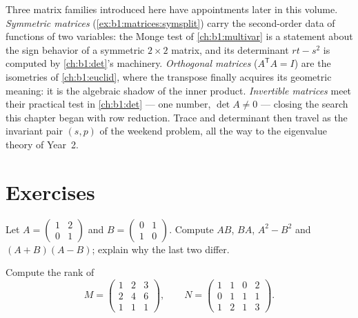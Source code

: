 \begin{remark}
\label{rem:b1:matrices:perspectives}
Three matrix families introduced here have appointments later in
this volume. \emph{Symmetric matrices}
(\cref{ex:b1:matrices:symsplit}) carry the second-order data of
functions of two variables: the Monge test of
\cref{ch:b1:multivar} is a statement about the sign behavior of
a symmetric $2\times2$ matrix, and its determinant $rt - s^2$
is computed by \cref{ch:b1:det}'s machinery. \emph{Orthogonal
matrices} ($A^{\mathsf T}A = I$) are the isometries of
\cref{ch:b1:euclid}, where the transpose finally acquires its
geometric meaning: it is the algebraic shadow of the inner
product. \emph{Invertible matrices} meet their practical test
in \cref{ch:b1:det} --- one number, $\det A \neq 0$ --- closing
the search this chapter began with row reduction. Trace and
determinant then travel as the invariant pair $(s, p)$ of the
weekend problem, all the way to the eigenvalue theory of
Year~2.
\end{remark}

\section{Exercises}

\begin{exercise}[$\star$]\label{exo:b1:matrices:1}
Let $A = \begin{pmatrix} 1 & 2 \\ 0 & 1 \end{pmatrix}$ and $B =
\begin{pmatrix} 0 & 1 \\ 1 & 0\end{pmatrix}$. Compute $AB$, $BA$,
$A^2 - B^2$ and $(A+B)(A-B)$; explain why the last two differ.
\end{exercise}

\begin{exercise}[$\star$]\label{exo:b1:matrices:2}
Compute the rank of
\[
M = \begin{pmatrix}
1 & 2 & 3\\
2 & 4 & 6\\
1 & 1 & 1
\end{pmatrix},
\qquad
N = \begin{pmatrix}
1 & 1 & 0 & 2\\
0 & 1 & 1 & 1\\
1 & 2 & 1 & 3
\end{pmatrix}.
\]
\end{exercise}

